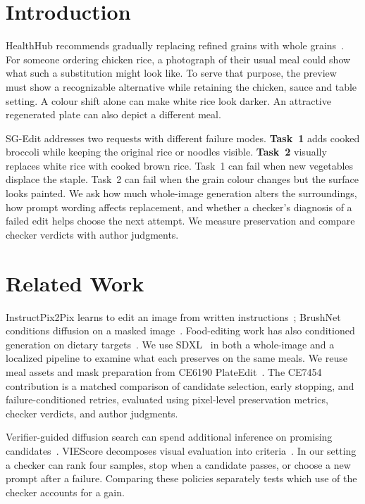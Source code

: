 \section{Introduction}

HealthHub recommends gradually replacing refined grains with whole grains~\cite{healthhubWholegrains}. For someone ordering chicken rice, a photograph of their usual meal could show what such a substitution might look like. To serve that purpose, the preview must show a recognizable alternative while retaining the chicken, sauce and table setting. A colour shift alone can make white rice look darker. An attractive regenerated plate can also depict a different meal.

SG-Edit addresses two requests with different failure modes. \textbf{Task~1} adds cooked broccoli while keeping the original rice or noodles visible. \textbf{Task~2} visually replaces white rice with cooked brown rice. Task~1 can fail when new vegetables displace the staple. Task~2 can fail when the grain colour changes but the surface looks painted. We ask how much whole-image generation alters the surroundings, how prompt wording affects replacement, and whether a checker's diagnosis of a failed edit helps choose the next attempt. We measure preservation and compare checker verdicts with author judgments.

\section{Related Work}

InstructPix2Pix learns to edit an image from written instructions~\cite{brooks2023instructpix2pix}; BrushNet conditions diffusion on a masked image~\cite{ju2024brushnet}. Food-editing work has also conditioned generation on dietary targets~\cite{yamamoto2025calorie}. We use SDXL~\cite{podell2024sdxl} in both a whole-image and a localized pipeline to examine what each preserves on the same meals. We reuse meal assets and mask preparation from CE6190 PlateEdit~\cite{ce6190plateedit2026}. The CE7454 contribution is a matched comparison of candidate selection, early stopping, and failure-conditioned retries, evaluated using pixel-level preservation metrics, checker verdicts, and author judgments.

Verifier-guided diffusion search can spend additional inference on promising candidates~\cite{ma2025scaling}. VIEScore decomposes visual evaluation into criteria~\cite{ku2024viescore}. In our setting a checker can rank four samples, stop when a candidate passes, or choose a new prompt after a failure. Comparing these policies separately tests which use of the checker accounts for a gain.

